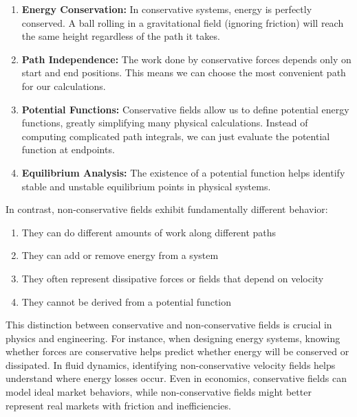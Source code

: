 \begin{enumerate}
   \item \textbf{Energy Conservation:} In conservative systems, energy is perfectly conserved. A ball rolling in a gravitational field (ignoring friction) will reach the same height regardless of the path it takes.
   
   \item \textbf{Path Independence:} The work done by conservative forces depends only on start and end positions. This means we can choose the most convenient path for our calculations.
   
   \item \textbf{Potential Functions:} Conservative fields allow us to define potential energy functions, greatly simplifying many physical calculations. Instead of computing complicated path integrals, we can just evaluate the potential function at endpoints.
   
   \item \textbf{Equilibrium Analysis:} The existence of a potential function helps identify stable and unstable equilibrium points in physical systems.
\end{enumerate}

\noindent In contrast, non-conservative fields exhibit fundamentally different behavior:
\begin{enumerate}
   \item They can do different amounts of work along different paths
   \item They can add or remove energy from a system
   \item They often represent dissipative forces or fields that depend on velocity
   \item They cannot be derived from a potential function
\end{enumerate}

\noindent This distinction between conservative and non-conservative fields is crucial in physics and engineering. For instance, when designing energy systems, knowing whether forces are conservative helps predict whether energy will be conserved or dissipated. In fluid dynamics, identifying non-conservative velocity fields helps understand where energy losses occur. Even in economics, conservative fields can model ideal market behaviors, while non-conservative fields might better represent real markets with friction and inefficiencies.


